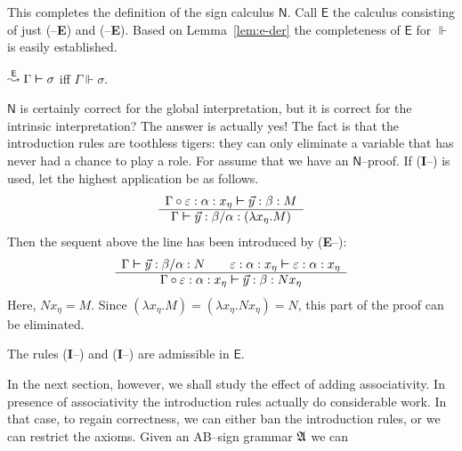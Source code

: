 This completes the definition of the sign calculus $\mathsf{N}$.
Call $\mathsf{E}$ the calculus consisting of just ({\mtt{\tf}}--\textbf{E}) 
and ({\mtt{\tb}}--\textbf{E}). Based on Lemma~\ref{lem:e-der} the 
completeness of $\mathsf{E}$ for $\Vdash$ is easily established.
\begin{thm}
$\stackrel{\mathsf{E}}{\leadsto} \Gamma \boldsymbol{\vdash} \sigma$ iff 
$\Gamma \Vdash \sigma$.
\end{thm}
$\mathsf{N}$ is certainly correct for the global interpretation, 
but it is correct for the intrinsic interpretation? The answer 
is actually yes! The fact is that the introduction rules are 
toothless tigers: they can only eliminate a variable that has 
never had a chance to play a role. For assume that we have an 
$\mathsf{N}$--proof. If (\textbf{I}--{\mtt{\tf}}) is used, let 
the highest application be as follows. 
\begin{equation}
\begin{array}{c}
\Gamma \circ \varepsilon : \alpha : x_{\eta} \boldsymbol{\vdash} \vec{y} : \beta : M
    \\\hline
\Gamma \boldsymbol{\vdash} \vec{y} : \beta/\alpha : (\lambda x_{\eta}. M)
\end{array} 
\end{equation}
Then the sequent above the line has been introduced by 
(\textbf{E}--{\mtt{\tf}}): 
\begin{equation}
\begin{array}{c}
\Gamma \boldsymbol{\vdash} \vec{y} : \beta/\alpha : N 
	\qquad \varepsilon : \alpha : x_{\eta} 
	\boldsymbol{\vdash} \varepsilon : \alpha : x_{\eta} 
    \\\hline
\Gamma \circ \varepsilon : \alpha : x_{\eta} \boldsymbol{\vdash} 
	\vec{y} : \beta : Nx_{\eta}
\end{array} 
\end{equation}
Here, $N x_{\eta} = M$. Since $(\lambda x_{\eta}.M) = 
(\lambda x_{\eta}.Nx_{\eta}) = N$, this part of the proof can 
be eliminated.
\begin{thm}
The rules \mbox{\rm (\textbf{I}--{\mtt{\tf}})} and 
\mbox{\rm (\textbf{I}--{\mtt{\tb}})} are admissible in $\mathsf{E}$.
\end{thm}
In the next section, however, we shall study the effect of adding 
associativity. In presence of associativity the introduction 
rules actually do considerable work. In that case, to regain 
correctness, we can either ban the introduction rules, or we 
can restrict the axioms. Given an AB--sign grammar $\mathfrak{A}$ we can 
